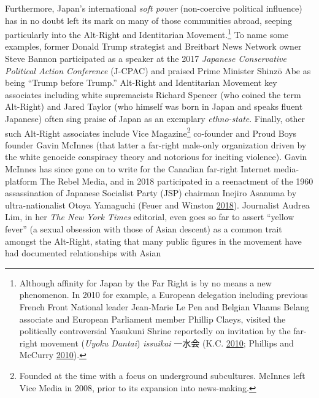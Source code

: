 \documentclass[10pt,british,A4paper,oneside]{memoir}
\begin{document}
Furthermore, Japan's international \emph{soft power} (non-coercive
political influence) has in no doubt left its mark on many of those
communities abroad, seeping particularly into the Alt-Right and
Identitarian Movement.\footnote{Although affinity for Japan by the Far
  Right is by no means a new phenomenon. In 2010 for example, a European
  delegation including previous French Front National leader Jean-Marie
  Le Pen and Belgian Vlaams Belang associate and European Parliament
  member Phillip Claeys, visited the politically controversial Yasukuni
  Shrine reportedly on invitation by the far-right movement (\emph{Uyoku
  Dantai}) \emph{issuikai} 一水会 (K.C.
  \protect\hyperlink{ref-k.c._how_2010}{2010}; Phillips and McCurry
  \protect\hyperlink{ref-phillips_bnp_2010}{2010}).\label{issuikai}} To
name some examples, former Donald Trump strategist and Breitbart News
Network owner Steve Bannon participated as a speaker at the 2017
\emph{Japanese Conservative Political Action Conference} (J-CPAC) and
praised Prime Minister Shinzō Abe as being ``Trump before Trump.''
Alt-Right and Identitarian Movement key associates including white
supremacists Richard Spencer (who coined the term Alt-Right) and Jared
Taylor (who himself was born in Japan and speaks fluent Japanese) often
sing praise of Japan as an exemplary \emph{ethno-state}. Finally, other
such Alt-Right associates include Vice Magazine\footnote{Founded at the
  time with a focus on underground subcultures. McInnes left Vice Media
  in 2008, prior to its expansion into news-making.} co-founder and
Proud Boys founder Gavin McInnes (that latter a far-right male-only
organization driven by the white genocide conspiracy theory and
notorious for inciting violence). Gavin McInnes has since gone on to
write for the Canadian far-right Internet media-platform The Rebel
Media, and in 2018 participated in a reenactment of the 1960
assassination of Japanese Socialist Party (JSP) chairman Inejiro Asanuma
by ultra-nationalist Otoya Yamaguchi (Feuer and Winston
\protect\hyperlink{ref-feuer_founder_2018}{2018}). Journalist Audrea
Lim, in her \emph{The New York Times} editorial, even goes so far to
assert ``yellow fever'' (a sexual obsession with those of Asian descent)
as a common trait amongst the Alt-Right, stating that many public
figures in the movement have had documented relationships with Asian
\end{document}
